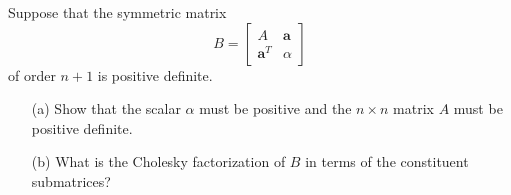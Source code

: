 \begin{pro}
  Suppose that the symmetric matrix
  \begin{displaymath}
    B =
    \begin{bmatrix}
      A & \mathbf{a} \\
      \mathbf{a}^T & \alpha
    \end{bmatrix}
  \end{displaymath}
  of order $n+1$ is positive definite.
  \begin{itemize}
  \item[(a)]
    Show that the scalar $\alpha$ must be positive and
    the $n\times n$ matrix $A$ must be positive definite.

  \item[(b)]
    What is the Cholesky factorization of $B$ in terms of the
    constituent submatrices?
  \end{itemize}
\end{pro}

